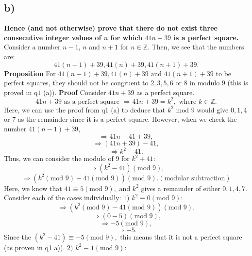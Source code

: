 \documentclass{article}
\begin{document}
\subsection{b)}
\textbf{ Hence (and not otherwise) prove that there do not exist three consecutive integer values of $n$ for which $41n + 39$ is a perfect square. }
\newline
\newline
Consider a number $n - 1$, $n$ and $n + 1$ for $n \in \mathbb{Z}$. 
Then, we see that the numbers are: 
$$41(n - 1) + 39, 41(n) + 39, 41(n + 1) + 39.$$
\newline
\newline
\textbf{ Proposition } For $41(n - 1) + 39, 41(n) + 39 \text{ and } 41(n + 1) + 39$ to be perfect squares, they should not be congruent to $2, 3, 5, 6 \text{ or } 8$ in modulo $9$ (this is proved in q$1$ (a)).
\newline
\newline
\textbf{Proof } Consider $41n + 39$ as a perfect square.
\newline
\newline
$$41n + 39 \text{ as a perfect square } \Rightarrow 41n + 39 = k^2, \text{ where } k \in \mathbb{Z}.$$
Here, we can use the proof from q1 (a) to deduce that $k^2 \text{ mod } 9$ would give $0, 1, 4$ or $7$ as the remainder since it is a perfect square. 
\newline
\newline
However, when we check the number $41(n - 1) + 39,$
$$\Rightarrow 41n - 41 + 39,$$
$$\Rightarrow (41n + 39) - 41,$$
$$\Rightarrow k^2 - 41.$$
Thus, we can consider the modulo of $9$ for $k^2 + 41$:
$$\Rightarrow (k^2 - 41) (\text{mod } 9),$$
$$\Rightarrow (k^2 (\text{mod } 9) - 41 (\text{mod } 9)) (\text{mod } 9). (\text{modular subtraction})$$
Here, we know that $41 \equiv 5 (\text{mod } 9),$ and $k^2$ gives a remainder of either $0, 1, 4, 7.$ Consider each of the cases individually:
\newline
$1) $ $k^2 \equiv 0 (\text{mod } 9)$:
\newline
\newline
$$\Rightarrow (k^2 (\text{mod } 9) - 41 (\text{mod } 9)) (\text{mod } 9).$$
$$\Rightarrow (0 - 5) (\text{mod } 9),$$
$$\Rightarrow -5 (\text{mod } 9),$$
$$\Rightarrow -5.$$
Since the $(k^2 - 41) \equiv -5 (\text{mod } 9),$ this means that it is not a perfect square (as proven in q1 a)).
\newline
$2) $ $k^2 \equiv 1 (\text{mod } 9)$:
\newline
\newline
\end{document}
